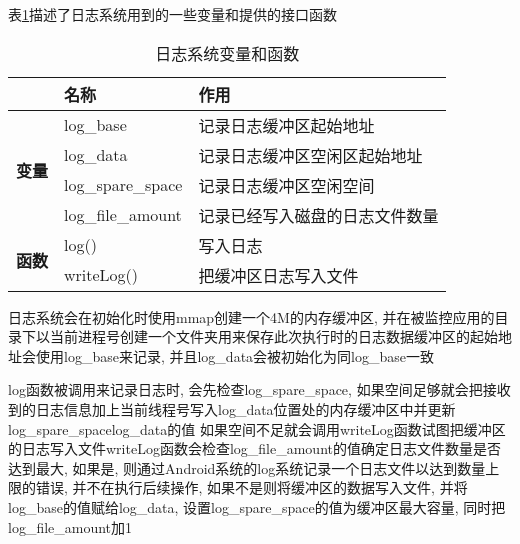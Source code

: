 表\ref{logValue}描述了日志系统用到的一些变量和提供的接口函数\juhao 
\begin{table}[ht]
	\centering
	\caption{日志系统变量和函数}
	\begin{tabular}{cll}
		\hline
		\multicolumn{1}{l}{}                             & \textbf{名称}       & \textbf{作用}     \\ \hline
		\multirow{4}{*}{\textbf{变量}}                     & log\_base         & 记录日志缓冲区起始地址     \\
		& log\_data         & 记录日志缓冲区空闲区起始地址  \\
		& log\_spare\_space & 记录日志缓冲区空闲空间     \\
		& log\_file\_amount & 记录已经写入磁盘的日志文件数量 \\ \hline
		\multicolumn{1}{l}{\multirow{2}{*}{\textbf{函数}}} & log()             & 写入日志            \\
		\multicolumn{1}{l}{}                             & writeLog()        & 把缓冲区日志写入文件      \\ \hline
	\end{tabular}
\label{logValue}
\end{table}
日志系统会在初始化时使用mmap创建一个4M的内存缓冲区, 并在被监控应用的目录下以当前进程号创建一个文件夹用来保存此次执行时的日志数据\juhao 缓冲区的起始地址会使用log\_base来记录, 并且log\_data会被初始化为同log\_base一致\juhao 

log函数被调用来记录日志时, 会先检查log\_spare\_space, 如果空间足够就会把接收到的日志信息加上当前线程号写入log\_data位置处的内存缓冲区中并更新log\_spare\_space\dunhao log\_data的值 \juhao 如果空间不足就会调用writeLog函数试图把缓冲区的日志写入文件\juhao writeLog函数会检查log\_file\_amount的值确定日志文件数量是否达到最大, 如果是, 则通过Android系统的log系统记录一个日志文件以达到数量上限的错误, 并不在执行后续操作, 如果不是则将缓冲区的数据写入文件, 并将log\_base的值赋给log\_data, 设置log\_spare\_space的值为缓冲区最大容量, 同时把log\_file\_amount加1\juhao 

